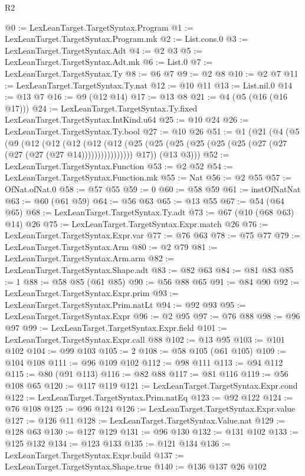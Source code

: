 \begin{lexlean}{R2}
\begin{coremodule}
@0 := LexLeanTarget.TargetSyntax.Program
@1 := LexLeanTarget.TargetSyntax.Program.mk
@2 := List.cons.{0}
@3 := LexLeanTarget.TargetSyntax.Adt
@4 := @2 @3
@5 := LexLeanTarget.TargetSyntax.Adt.mk
@6 := List.{0}
@7 := LexLeanTarget.TargetSyntax.Ty
@8 := @6 @7
@9 := @2 @8
@10 := @2 @7
@11 := LexLeanTarget.TargetSyntax.Ty.nat
@12 := @10 @11
@13 := List.nil.{0}
@14 := @13 @7
@16 := @9 (@12 @14)
@17 := @13 @8
@21 := @4 (@5 (@16 (@16 @17)))
@24 := LexLeanTarget.TargetSyntax.Ty.fixed LexLeanTarget.TargetSyntax.IntKind.u64
@25 := @10 @24
@26 := LexLeanTarget.TargetSyntax.Ty.bool
@27 := @10 @26
@51 := @1
    (@21
      (@4
        (@5
          (@9
            (@12
              (@12
                (@12
                  (@12
                    (@12 (@25 (@25 (@25 (@25 (@25 (@25 (@27 (@27 (@27 (@27 (@27 @14))))))))))))))))
            @17))
        (@13 @3)))
@52 := LexLeanTarget.TargetSyntax.Function
@53 := @2 @52
@54 := LexLeanTarget.TargetSyntax.Function.mk
@55 := Nat
@56 := @2 @55
@57 := OfNat.ofNat.{0}
@58 := @57 @55
@59 := 0
@60 := @58 @59
@61 := instOfNatNat
@63 := @60 (@61 @59)
@64 := @56 @63
@65 := @13 @55
@67 := @54 (@64 @65)
@68 := LexLeanTarget.TargetSyntax.Ty.adt
@73 := @67 (@10 (@68 @63) @14) @26
@75 := LexLeanTarget.TargetSyntax.Expr.match @26
@76 := LexLeanTarget.TargetSyntax.Expr.var
@77 := @76 @63
@78 := @75 @77
@79 := LexLeanTarget.TargetSyntax.Arm
@80 := @2 @79
@81 := LexLeanTarget.TargetSyntax.Arm.arm
@82 := LexLeanTarget.TargetSyntax.Shape.adt
@83 := @82 @63
@84 := @81 @83
@85 := 1
@88 := @58 @85 (@61 @85)
@90 := @56 @88 @65
@91 := @84 @90
@92 := LexLeanTarget.TargetSyntax.Expr.prim
@93 := LexLeanTarget.TargetSyntax.Prim.natLt
@94 := @92 @93
@95 := LexLeanTarget.TargetSyntax.Expr
@96 := @2 @95
@97 := @76 @88
@98 := @96 @97
@99 := LexLeanTarget.TargetSyntax.Expr.field
@101 := LexLeanTarget.TargetSyntax.Expr.call @88
@102 := @13 @95
@103 := @101 @102
@104 := @99 @103
@105 := 2
@108 := @58 @105 (@61 @105)
@109 := @104 @108
@111 := @96 @109 @102
@112 := @98 @111
@113 := @94 @112
@115 := @80 (@91 @113)
@116 := @82 @88
@117 := @81 @116
@119 := @56 @108 @65
@120 := @117 @119
@121 := LexLeanTarget.TargetSyntax.Expr.cond
@122 := LexLeanTarget.TargetSyntax.Prim.natEq
@123 := @92 @122
@124 := @76 @108
@125 := @96 @124
@126 := LexLeanTarget.TargetSyntax.Expr.value
@127 := @126 @11
@128 := LexLeanTarget.TargetSyntax.Value.nat
@129 := @128 @63
@130 := @127 @129
@131 := @96 @130
@132 := @131 @102
@133 := @125 @132
@134 := @123 @133
@135 := @121 @134
@136 := LexLeanTarget.TargetSyntax.Expr.build
@137 := LexLeanTarget.TargetSyntax.Shape.true
@140 := @136 @137 @26 @102

\end{coremodule}
\end{lexlean}
